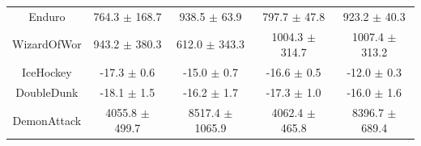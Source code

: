 \begin{table}[h]
\begin{tabular}{ccccc}
Enduro        &     764.3 $\pm$ 168.7 &      938.5 $\pm$ 63.9 &      797.7 $\pm$ 47.8 &      923.2 $\pm$ 40.3 \\
WizardOfWor   &     943.2 $\pm$ 380.3 &     612.0 $\pm$ 343.3 &    1004.3 $\pm$ 314.7 &    1007.4 $\pm$ 313.2 \\
IceHockey     &       -17.3 $\pm$ 0.6 &       -15.0 $\pm$ 0.7 &       -16.6 $\pm$ 0.5 &       -12.0 $\pm$ 0.3 \\
DoubleDunk    &       -18.1 $\pm$ 1.5 &       -16.2 $\pm$ 1.7 &       -17.3 $\pm$ 1.0 &       -16.0 $\pm$ 1.6 \\
DemonAttack   &    4055.8 $\pm$ 499.7 &   8517.4 $\pm$ 1065.9 &    4062.4 $\pm$ 465.8 &    8396.7 $\pm$ 689.4 \\
\bottomrule
\end{tabular}
\end{table}

